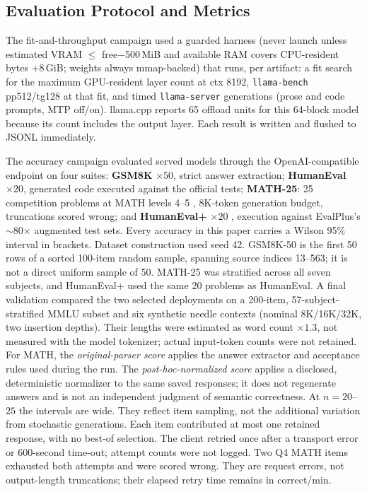 \documentclass[11pt]{article}
\newcommand{\q}[1]{\texttt{#1}}
\begin{document}
\subsection{Evaluation Protocol and Metrics}
\label{sec:harness}

The fit-and-throughput campaign used a guarded harness (never launch unless estimated VRAM $\leq$
free$-$500\,MiB and available RAM covers CPU-resident bytes $+8$\,GiB; weights
always mmap-backed) that runs, per artifact: a fit search for the maximum
GPU-resident layer count at ctx 8192, \q{llama-bench} pp512/tg128 at that fit,
and timed \q{llama-server} generations (prose and code prompts, MTP off/on).
llama.cpp reports 65 offload units for this 64-block model because its count
includes the output layer. Each result is written and flushed to JSONL
immediately.

The accuracy campaign evaluated served models through the OpenAI-compatible endpoint on four
suites: \textbf{GSM8K} \citep{cobbe2021gsm8k} $\times 50$, strict answer
extraction; \textbf{HumanEval} \citep{chen2021humaneval} $\times 20$, generated
code executed against the official tests; \textbf{MATH-25}: 25 competition
problems at MATH levels 4--5 \citep{hendrycks2021math}, 8K-token generation
budget, truncations scored wrong; and \textbf{HumanEval+} $\times 20$
\citep{liu2023evalplus}, execution against EvalPlus's $\sim$80$\times$
augmented test sets. Every accuracy in this paper carries a Wilson 95\%
interval in brackets. Dataset construction used seed 42. GSM8K-50 is the first
50 rows of a sorted 100-item random sample, spanning source indices 13--563;
it is not a direct uniform sample of 50. MATH-25 was stratified across all seven
subjects, and HumanEval+ used the same
20 problems as HumanEval. A final validation compared the two selected
deployments on a 200-item, 57-subject-stratified MMLU subset
\citep{hendrycks2021mmlu} and six synthetic
needle contexts (nominal 8K/16K/32K, two insertion depths). Their lengths were
estimated as word count $\times 1.3$, not measured with the model tokenizer;
actual input-token counts were not retained. For MATH, the
\emph{original-parser score} applies the answer extractor and acceptance rules
used during the run. The \emph{post-hoc-normalized score} applies a disclosed,
deterministic normalizer to the same saved responses; it does not regenerate
answers and is not an independent judgment of semantic correctness. At
$n{=}20$--$25$ the
intervals are wide. They reflect item sampling, not the additional variation
from stochastic generations. Each item contributed at most one retained
response, with no best-of selection. The client retried once after a transport
error or 600-second time-out; attempt counts were not logged. Two Q4 MATH
items exhausted both attempts and were scored wrong. They are request errors,
not output-length truncations; their elapsed retry time remains in correct/min.
\end{document}
